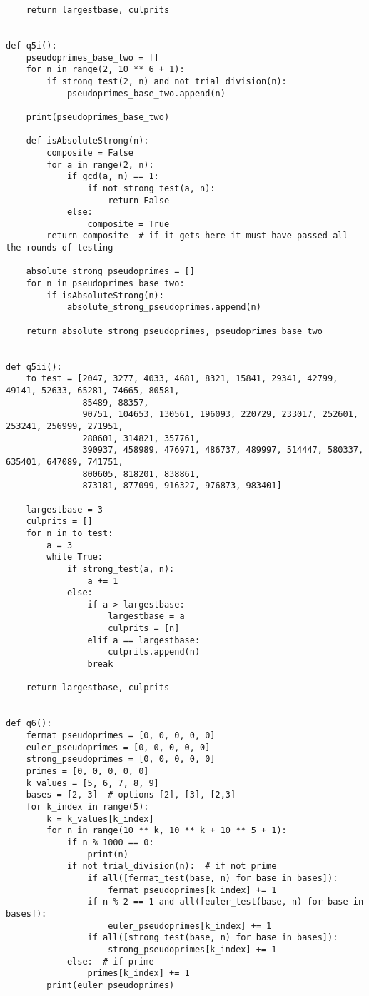 \documentclass[10pt,a4paper]{report}
\begin{document}
\begin{verbatim}
    return largestbase, culprits


def q5i():
    pseudoprimes_base_two = []
    for n in range(2, 10 ** 6 + 1):
        if strong_test(2, n) and not trial_division(n):
            pseudoprimes_base_two.append(n)

    print(pseudoprimes_base_two)

    def isAbsoluteStrong(n):
        composite = False
        for a in range(2, n):
            if gcd(a, n) == 1:
                if not strong_test(a, n):
                    return False
            else:
                composite = True
        return composite  # if it gets here it must have passed all the rounds of testing

    absolute_strong_pseudoprimes = []
    for n in pseudoprimes_base_two:
        if isAbsoluteStrong(n):
            absolute_strong_pseudoprimes.append(n)

    return absolute_strong_pseudoprimes, pseudoprimes_base_two


def q5ii():
    to_test = [2047, 3277, 4033, 4681, 8321, 15841, 29341, 42799, 49141, 52633, 65281, 74665, 80581,
               85489, 88357,
               90751, 104653, 130561, 196093, 220729, 233017, 252601, 253241, 256999, 271951,
               280601, 314821, 357761,
               390937, 458989, 476971, 486737, 489997, 514447, 580337, 635401, 647089, 741751,
               800605, 818201, 838861,
               873181, 877099, 916327, 976873, 983401]

    largestbase = 3
    culprits = []
    for n in to_test:
        a = 3
        while True:
            if strong_test(a, n):
                a += 1
            else:
                if a > largestbase:
                    largestbase = a
                    culprits = [n]
                elif a == largestbase:
                    culprits.append(n)
                break

    return largestbase, culprits


def q6():
    fermat_pseudoprimes = [0, 0, 0, 0, 0]
    euler_pseudoprimes = [0, 0, 0, 0, 0]
    strong_pseudoprimes = [0, 0, 0, 0, 0]
    primes = [0, 0, 0, 0, 0]
    k_values = [5, 6, 7, 8, 9]
    bases = [2, 3]  # options [2], [3], [2,3]
    for k_index in range(5):
        k = k_values[k_index]
        for n in range(10 ** k, 10 ** k + 10 ** 5 + 1):
            if n % 1000 == 0:
                print(n)
            if not trial_division(n):  # if not prime
                if all([fermat_test(base, n) for base in bases]):
                    fermat_pseudoprimes[k_index] += 1
                if n % 2 == 1 and all([euler_test(base, n) for base in bases]):
                    euler_pseudoprimes[k_index] += 1
                if all([strong_test(base, n) for base in bases]):
                    strong_pseudoprimes[k_index] += 1
            else:  # if prime
                primes[k_index] += 1
        print(euler_pseudoprimes)


\end{verbatim}
\end{document}
